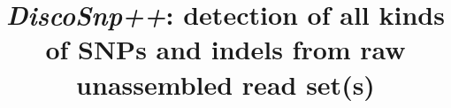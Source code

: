 \documentclass{bmcart}
\begin{document}
\begin{frontmatter}

\begin{fmbox}


\title{{\it DiscoSnp++}: detection of all kinds of SNPs and indels from raw unassembled read set(s)}


\author[
   addressref={aff1},                   %
   corref={aff1},                       %
   email={pierre.peterlongo@inria.fr}   %
]{ }
 \author[
    addressref={aff1},
    email={erwan.drezen@inria.fr}
 ]{ }
 \author[
    addressref={aff1},
    email={claire.lemaitre@inria.fr}
 ]{ }
 \author[
    addressref={aff1},
    email={chloe.riou@inria.fr}
 ]{ }




\end{fmbox}
\end{frontmatter}
\end{document}
